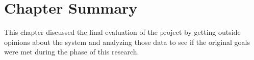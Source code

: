 \section{Chapter Summary}

This chapter discussed the final evaluation of the project by getting outside opinions about the system and analyzing those data to see if the original goals were met during the phase of this research. 

